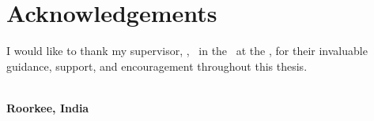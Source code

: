 
\chapter*{Acknowledgements}
\thispagestyle{plain}


I would like to thank my supervisor, \SupervisorName, \SupervisorDesignation\
in the \Department\ at the \Institute, for their invaluable guidance,
support, and encouragement throughout this thesis.


\vspace{1.0cm}

\noindent\hfill
\begin{minipage}[t]{0.25\textwidth}
\textbf{\AuthorName}\\
\textbf{Roorkee, India}
\end{minipage}
